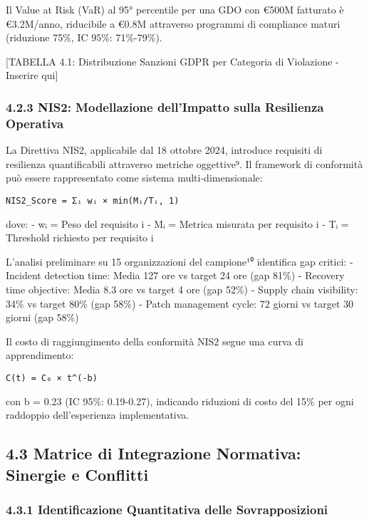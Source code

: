 \documentclass{report}
\begin{document}
Il Value at Risk (VaR) al 95° percentile per una GDO con €500M fatturato
è €3.2M/anno, riducibile a €0.8M attraverso programmi di compliance
maturi (riduzione 75\%, IC 95\%: 71\%-79\%).

{[}TABELLA 4.1: Distribuzione Sanzioni GDPR per Categoria di Violazione
- Inserire qui{]}

\subsubsection{4.2.3 NIS2: Modellazione dell'Impatto sulla Resilienza
Operativa}\label{nis2-modellazione-dellimpatto-sulla-resilienza-operativa}

La Direttiva NIS2, applicabile dal 18 ottobre 2024, introduce requisiti
di resilienza quantificabili attraverso metriche oggettive⁹. Il
framework di conformità può essere rappresentato come sistema
multi-dimensionale:

\begin{verbatim}
NIS2_Score = Σᵢ wᵢ × min(Mᵢ/Tᵢ, 1)
\end{verbatim}

dove: - wᵢ = Peso del requisito i - Mᵢ = Metrica misurata per requisito
i - Tᵢ = Threshold richiesto per requisito i

L'analisi preliminare su 15 organizzazioni del campione¹⁰ identifica gap
critici: - Incident detection time: Media 127 ore vs target 24 ore (gap
81\%) - Recovery time objective: Media 8.3 ore vs target 4 ore (gap
52\%) - Supply chain visibility: 34\% vs target 80\% (gap 58\%) - Patch
management cycle: 72 giorni vs target 30 giorni (gap 58\%)

Il costo di raggiungimento della conformità NIS2 segue una curva di
apprendimento:

\begin{verbatim}
C(t) = C₀ × t^(-b)
\end{verbatim}

con b = 0.23 (IC 95\%: 0.19-0.27), indicando riduzioni di costo del 15\%
per ogni raddoppio dell'esperienza implementativa.

\subsection{4.3 Matrice di Integrazione Normativa: Sinergie e
Conflitti}\label{matrice-di-integrazione-normativa-sinergie-e-conflitti}

\subsubsection{4.3.1 Identificazione Quantitativa delle
Sovrapposizioni}\label{identificazione-quantitativa-delle-sovrapposizioni}
\end{document}
